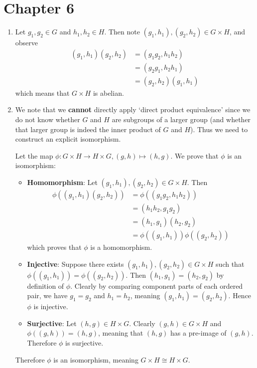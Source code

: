 \section*{Chapter 6}
\begin{enumerate}
    \item Let $g_1, g_2 \in G$ and $h_1, h_2 \in H$. Then note $(g_1, h_1), (g_2, h_2) \in G\times H$, and observe
    \begin{align*}
        (g_1, h_1)(g_2, h_2) &= (g_1g_2, h_1h_2)\\
        &= (g_2g_1, h_2h_1)\\
        &= (g_2,h_2)(g_1,h_1)
    \end{align*}
    which means that $G \times H$ is abelian.

    \item We note that we \textbf{cannot} directly apply `direct product equivalence' since we do not know whether $G$ and $H$ are subgroups of a larger group (and whether that larger group is indeed the inner product of $G$ and $H$). Thus we need to construct an explicit isomorphism.

    Let the map $\phi: G\times H \to H \times G, (g, h) \mapsto (h, g)$. We prove that $\phi$ is an isomorphism:
    \begin{itemize}
        \item \textbf{Homomorphism}: Let $(g_1, h_1), (g_2, h_2) \in G \times H$. Then
        \begin{align*}
            \phi((g_1, h_1)(g_2, h_2)) &= \phi((g_1g_2, h_1h_2))\\
            &= (h_1h_2, g_1g_2)\\
            &= (h_1, g_1)(h_2, g_2)\\
            &= \phi((g_1, h_1))\phi((g_2, h_2))
        \end{align*}
        which proves that $\phi$ is a homomorphism.
        \item \textbf{Injective}: Suppose there exists $(g_1, h_1), (g_2, h_2) \in G \times H$ such that $\phi((g_1, h_1)) = \phi((g_2, h_2))$. Then $(h_1, g_1) = (h_2, g_2)$ by definition of $\phi$. Clearly by comparing component parts of each ordered pair, we have $g_1 = g_2$ and $h_1 = h_2$, meaning $(g_1, h_1) = (g_2, h_2)$. Hence $\phi$ is injective.
        \item \textbf{Surjective}: Let $(h, g) \in H \times G$. Clearly $(g, h) \in G \times H$ and $\phi((g, h)) = (h, g)$, meaning that $(h, g)$ has a pre-image of $(g, h)$. Therefore $\phi$ is surjective.
    \end{itemize}
    Therefore $\phi$ is an isomorphism, meaning $G \times H \cong H \times G$.


\end{enumerate}
